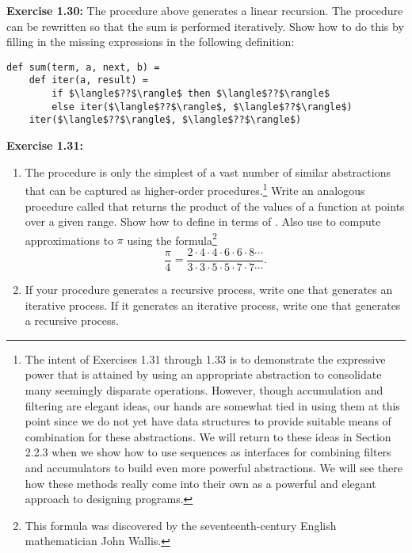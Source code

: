 \textbf{Exercise 1.30:} The  procedure above generates a linear recursion. The procedure can be rewritten so that the sum is performed iteratively. Show how to do this by filling in the missing expressions in the following definition:

\begin{lstlisting}[style=plain]
def sum(term, a, next, b) =
    def iter(a, result) =
        if $\langle$??$\rangle$ then $\langle$??$\rangle$
        else iter($\langle$??$\rangle$, $\langle$??$\rangle$)
    iter($\langle$??$\rangle$, $\langle$??$\rangle$)
\end{lstlisting}

\textbf{Exercise 1.31:}
\begin{enumerate}
\item The  procedure is only the simplest of a vast number of similar abstractions that can be captured as higher-order procedures.\footnote{The intent of Exercises 1.31 through 1.33 is to demonstrate the expressive power that is attained by using an appropriate abstraction to consolidate many seemingly disparate operations. However, though accumulation and filtering are elegant ideas, our hands are somewhat tied in using them at this point since we do not yet have data structures to provide suitable means of combination for these abstractions. We will return to these ideas in Section 2.2.3 when we show how to use sequences as interfaces for combining filters and accumulators to build even more powerful abstractions. We will see there how these methods really come into their own as a powerful and elegant approach to designing programs.} Write an analogous procedure called  that returns the product of the values of a function at points over a given range. Show how to define  in terms of . Also use  to compute approximations to $\pi$ using the formula\footnote{This formula was discovered by the seventeenth-century English mathematician John Wallis.}
\[
\frac{\pi}{4} = \frac{2 \cdot 4 \cdot 4 \cdot 6 \cdot 6 \cdot 8 \cdots}{3 \cdot 3 \cdot 5 \cdot 5 \cdot 7 \cdot 7 \cdots}.
\]

\item If your  procedure generates a recursive process, write one that generates an iterative process. If it generates an iterative process, write one that generates a recursive process.
\end{enumerate}

